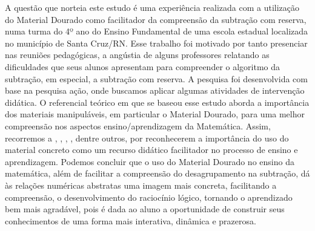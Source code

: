 \begin{refsection}
    \begin{galoResumo}
        A questão que norteia este estudo é uma experiência realizada com a utilização do Material Dourado como facilitador da compreensão da subtração com reserva, numa turma do 4º ano do Ensino Fundamental de uma escola estadual localizada no município de Santa Cruz/RN. Esse trabalho foi motivado por tanto presenciar nas reuniões pedagógicas, a angústia de alguns professores relatando as dificuldades que seus alunos apresentam para compreender o algoritmo da subtração, em especial, a subtração com reserva. A pesquisa foi desenvolvida com base na pesquisa ação, onde buscamos aplicar algumas atividades de intervenção didática. O referencial teórico em que se baseou esse estudo aborda a importância dos materiais manipuláveis, em particular o Material Dourado, para uma melhor compreensão nos aspectos ensino/aprendizagem da Matemática. Assim, recorremos a \textcite{NACARATO2005trabalho}, \textcite{BERTONAndITACARAMBI2009Números}, \textcite{LORENZATO2006Começar}, \textcite{CENTURIÓN1995Números}, dentre outros, por reconhecerem a importância do uso do material concreto como um recurso didático facilitador no processo de ensino e aprendizagem. Podemos concluir que o uso do Material Dourado no ensino da matemática, além de facilitar a compreensão do desagrupamento na subtração, dá às relações numéricas abstratas uma imagem mais concreta, facilitando a compreensão, o desenvolvimento do raciocínio lógico, tornando o aprendizado bem mais agradável, pois é dada ao aluno a oportunidade de construir seus conhecimentos de uma forma mais interativa, dinâmica e prazerosa.
    \end{galoResumo}
    
    
    \begin{otherlanguage}{english}


\end{otherlanguage}
\end{refsection}
